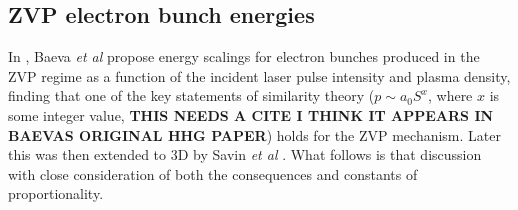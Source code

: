 \subsection{ZVP electron bunch energies}\label{sec:zvp_energies_derivation}
In \cite{baevaZeroVectorPotential2011}, Baeva \textit{et al} propose energy scalings for electron bunches produced in the \ac{ZVP} regime as a function of the incident laser pulse intensity and plasma density, finding that one of the key statements of similarity theory ($p \sim a_0 S^x$, where $x$ is some integer value, \textbf{THIS NEEDS A CITE I THINK IT APPEARS IN BAEVAS ORIGINAL HHG PAPER}) holds for the \ac{ZVP} mechanism. Later this was then extended to \ac{3D} by Savin \textit{et al} \cite{savinAttosecondscaleAbsorptionExtreme2017}. What follows is that discussion with close consideration of both the consequences and constants of proportionality.

